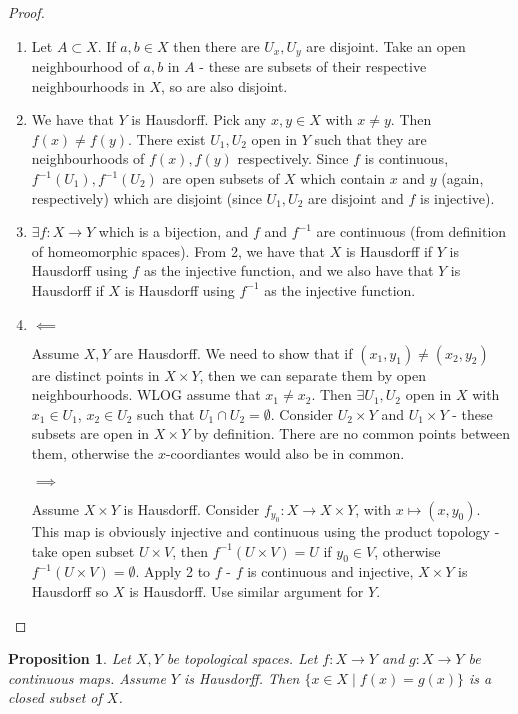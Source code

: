\documentclass{article}
\theoremstyle{definition}
\theoremstyle{plain}%
\newtheorem{prop}[thm]{Proposition}
\theoremstyle{remark}
\newcommand{\intersection}{\cap}
\begin{document}
\begin{proof}
    \hspace{0.1em}
    \begin{enumerate}
        \item Let $A \subset X$. If $a,b \in X$ then there are $U_x, U_y$ are disjoint. Take an open neighbourhood of $a,b$ in $A$ - these are subsets of their respective neighbourhoods in $X$, so are also disjoint.
        \item We have that $Y$ is Hausdorff. Pick any $x,y \in X$ with $x \ne y$. Then $f(x) \ne f(y)$. There exist $U_1, U_2$ open in $Y$ such that they are neighbourhoods of $f(x), f(y)$ respectively. Since $f$ is continuous, $f^{-1}(U_1), f^{-1}(U_2)$ are open subsets of $X$ which contain $x$ and $y$ (again, respectively) which are disjoint (since $U_1,U_2$ are disjoint and $f$ is injective).
        \item $\exists f : X \to Y$ which is a bijection, and $f$ and $f^{-1}$ are continuous (from definition of homeomorphic spaces). From 2, we have that $X$ is Hausdorff if $Y$ is Hausdorff using $f$ as the injective function, and we also have that $Y$ is Hausdorff if $X$ is Hausdorff using $f^{-1}$ as the injective function.
        \item
        $\impliedby$
        
        Assume $X,Y$ are Hausdorff. We need to show that if $(x_1,y_1) \ne (x_2, y_2)$ are distinct points in $X \times Y$, then we can separate them by open neighbourhoods. WLOG assume that $x_1 \ne x_2$. Then $\exists U_1, U_2$ open in $X$ with $x_1 \in U_1$, $x_2 \in U_2$ such that $U_1 \intersection U_2 = \emptyset$. Consider $U_2 \times Y$ and $U_1 \times Y$ - these subsets are open in $X \times Y$ by definition. There are no common points between them, otherwise the $x$-coordiantes would also be in common.
        
        $\implies$
        
        Assume $X \times Y$ is Hausdorff. Consider $f_{y_0}: X \to X \times Y$,  with $x \mapsto (x, y_0)$. This map is obviously injective and continuous using the product topology - take open subset $U \times V$, then $f^{-1}(U \times V) = U$ if $y_0 \in V$, otherwise $f^{-1}(U \times V) = \emptyset$. Apply 2 to $f$ - $f$ is continuous and injective, $X \times Y$ is Hausdorff so $X$ is Hausdorff. Use similar argument for $Y$.
    \end{enumerate}
\end{proof}

\begin{prop}\label{set of agreed points is closed}
    Let $X,Y$ be topological spaces. Let $f: X \to Y$ and $g: X \to Y$ be continuous maps. Assume $Y$ is Hausdorff. Then $\{x \in X \;|\; f(x) = g(x)\}$ is a closed subset of $X$.
\end{prop}
\end{document}

